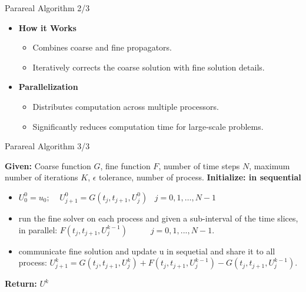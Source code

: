 \documentclass[aspectratio=169,xcolor=dvipsnames, t]{beamer}
\begin{document}
\begin{frame}{Parareal Algorithm 2/3}

\begin{itemize}
    \item \textbf{How it Works}
    \begin{itemize}
        \item Combines coarse and fine propagators.
        \item Iteratively corrects the coarse solution with fine solution details.
    \end{itemize}
    \item \textbf{Parallelization}
    \begin{itemize}
        \item Distributes computation across multiple processors.
        \item Significantly reduces computation time for large-scale problems.
    \end{itemize}
\end{itemize}
    
\end{frame}

\begin{frame}{Parareal Algorithm 3/3}
    \begin{algorithm}[H]
\caption{Parareal Algorithm (parallel)} 
\begin{algorithmic}[1]
\STATE \textbf{Given:} Coarse function $G$, fine function $F$, number of time steps $N$, maximum number of iterations $K$, $\epsilon$ tolerance, number of process.
\STATE \textbf{Initialize: in sequential} \begin{itemize}
    \item  $U_0^0 = u_0; \;\;\;\; U_{j+1}^0 = G(t_j,t_{j+1}, U_j^0) \;\;\;j = 0,1, \ldots, N-1$
\end{itemize}
    \begin{itemize}
        \item run the fine solver on each process and given a sub-interval of the time slices, in parallel: $F(t_j,t_{j+1}, U_j^{k-1}) \;\;\;\;\;\;\;\;\;\; j = 0,1, ... ,N-1$.
        \item  communicate fine solution and update u in sequetial and share it to all process: $ U_{j+1}^k = G(t_j,t_{j+1},U_j^k) + F(t_j,t_{j+1},U_j^{k-1}) -G(t_j,t_{j+1},U_j^{k-1})$.  
    \end{itemize}
\ENDWHILE
\STATE \textbf{Return:} $U^k$
\end{algorithmic}
\end{algorithm}
\end{frame}
\end{document}
